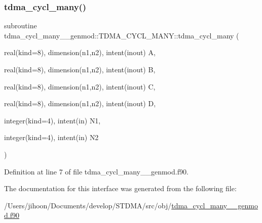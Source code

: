 \subsubsection{\texorpdfstring{tdma\_cycl\_many()}{tdma\_cycl\_many()}}
{\footnotesize\ttfamily subroutine tdma\+\_\+cycl\+\_\+many\+\_\+\+\_\+genmod\+::\+T\+D\+M\+A\+\_\+\+C\+Y\+C\+L\+\_\+\+M\+A\+N\+Y\+::tdma\+\_\+cycl\+\_\+many (\begin{DoxyParamCaption}\item[{real(kind=8), dimension(n1,n2), intent(inout)}]{A,  }\item[{real(kind=8), dimension(n1,n2), intent(inout)}]{B,  }\item[{real(kind=8), dimension(n1,n2), intent(inout)}]{C,  }\item[{real(kind=8), dimension(n1,n2), intent(inout)}]{D,  }\item[{integer(kind=4), intent(in)}]{N1,  }\item[{integer(kind=4), intent(in)}]{N2 }\end{DoxyParamCaption})}



Definition at line 7 of file tdma\+\_\+cycl\+\_\+many\+\_\+\+\_\+genmod.\+f90.



The documentation for this interface was generated from the following file\+:\begin{DoxyCompactItemize}
\item 
/\+Users/jihoon/\+Documents/develop/\+S\+T\+D\+M\+A/src/obj/\mbox{\hyperlink{tdma__cycl__many____genmod_8f90}{tdma\+\_\+cycl\+\_\+many\+\_\+\+\_\+genmod.\+f90}}\end{DoxyCompactItemize}
